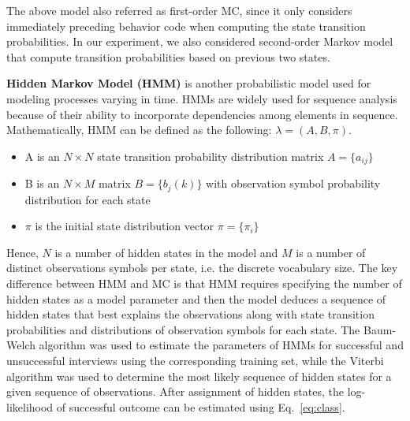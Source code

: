\documentclass{amia_summit_2018}
\begin{document}
The above model also referred as first-order MC, since it only considers immediately preceding behavior code when computing the state transition probabilities. In our experiment, we also considered second-order Markov model that compute transition probabilities based on previous two states.  

\textbf {Hidden Markov Model (HMM)} is another probabilistic model used for modeling processes varying in time. HMMs are widely used for sequence analysis because of their ability to incorporate dependencies among elements in sequence. Mathematically, HMM can be defined as the following: $\lambda = (A, B, \pi)$.
\begin{itemize}
\item A is an $N\times N$ state transition probability distribution matrix $A = \{a_{ij}\}$
\item B is an $N\times M$ matrix $B = \{b_j(k)\}$ with observation symbol probability distribution for each state 
\item $\pi$ is the initial state distribution vector $\pi = \{\pi_i\}$
\end{itemize}
Hence, $N$ is a number of hidden states in the model and $M$ is a number of distinct observations symbols per state, i.e. the discrete vocabulary size. The key difference between HMM and MC is that HMM requires specifying the number of hidden states as a model parameter and then the model deduces a sequence of hidden states that best explains the observations along with state transition probabilities and distributions of observation symbols for each state. The Baum-Welch algorithm was used to estimate the parameters of HMMs for successful and unsuccessful interviews using the corresponding training set, while the Viterbi algorithm was used to determine the most likely sequence of hidden states for a given sequence of observations. After assignment of hidden states, the log-likelihood of successful outcome can be estimated using Eq.~\ref{eq:class}.
\end{document}
